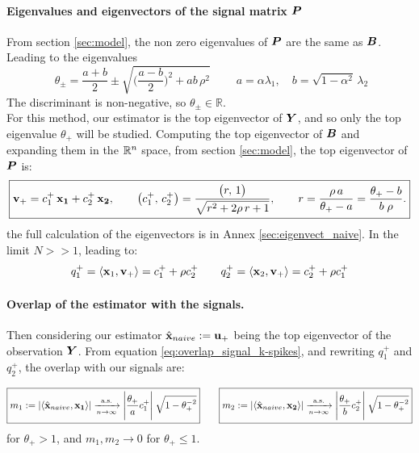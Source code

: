 \paragraph{Eigenvalues and eigenvectors of the signal matrix $\bm{P}$}
From section \ref{sec:model}, the non zero eigenvalues of $\bm{P}$ are the same as $\bm{B}$. Leading to the eigenvalues
\begin{equation}
    \boxed{\;
    \theta_\pm = \frac{a+b}{2} \pm \sqrt{\Big(\frac{a-b}{2}\Big)^2 + ab\,\rho^2}
    \;}
    \qquad
    a = \alpha\lambda_1, \quad b = \sqrt{1-\alpha^2}\,\lambda_2
    \label{eq:theta-pm}
\end{equation}
The discriminant is non-negative, so $\theta_\pm \in \mathbb{R}$. \\
For this method, our estimator is the top eigenvector of $\bm{Y}$, and so only the top eigenvalue $\theta_+$ will be studied. Computing the top eigenvector of $\bm{B}$ and expanding them in the ${\mathbb R}^n$ space, from section \ref{sec:model}, the top eigenvector of $\bm{P}$ is:
\[
    \boxed{
    \boldsymbol{\mathbf{v}}_+ = c_1^+\,\boldsymbol{\mathbf{x_1}} + c_2^+\,\boldsymbol{\mathbf{x_2}},
    \qquad
    \big(c_1^+,\, c_2^+\big) = \frac{\big(r,\, 1\big)}{\sqrt{r^2 + 2\rho\, r + 1}},
    \qquad
    r = \frac{\rho\, a}{\theta_+ - a} = \frac{\theta_+ - b }{b \; \rho}.
    }
\]
the full calculation of the eigenvectors is in Annex \ref{sec:eigenvect_naive}.
In the limit $N >> 1$, leading to:
\[
    q_1^+ = \langle \boldsymbol{\mathbf{x}}_1, \boldsymbol{\mathbf{v}}_+ \rangle = c_1^+ + \rho c_2^+ \qquad q_2^+ = \langle \boldsymbol{\mathbf{x}}_2, \boldsymbol{\mathbf{v}}_+ \rangle = c_2^+ + \rho c_1^+
\]


\paragraph{Overlap of the estimator with the signals.}
Then considering our estimator $\hat{\boldsymbol{\mathbf{x}}}_{naive} := \boldsymbol{\mathbf{u}}_+$ being the top eigenvector of the observation $\bm{Y}$. From equation \ref{eq:overlap_signal_k-spikes}, and rewriting $q_1^+$ and $q_2^+$, the overlap with our signals are:

\begin{equation}
\boxed{
    m_1 := |\langle \hat{\boldsymbol{\mathbf{x}}}_{naive}, \boldsymbol{\mathbf{x_1}}\rangle| \xrightarrow[n\to\infty]{\text{a.s.}} \Bigg \lvert \frac{\theta_+}{a}c_1^+ \Bigg \rvert \; \sqrt{1-\theta_+^{-2}} }
    \qquad
    \boxed{
    m_2 := |\langle \hat{\boldsymbol{\mathbf{x}}}_{naive}, \boldsymbol{\mathbf{x_2}}\rangle| \xrightarrow[n\to\infty]{\text{a.s.}} \Bigg \lvert  \frac{\theta_+}{b}c_2^+  \Bigg \rvert \; \sqrt{1-\theta_+^{-2}} }
    \label{eq:m12-naive}
\end{equation}
for $\theta_+ > 1$, and $m_1, m_2 \to 0$ for $\theta_+ \le 1$.


